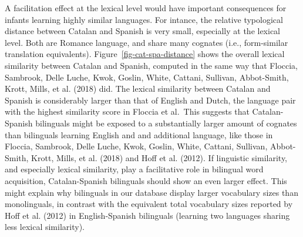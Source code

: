 \documentclass[
  12pt,
  b5paperpaper,
  twoside]{scrreprt}
\begin{document}
A facilitation effect at the lexical level would have important
consequences for infants learning highly similar languages. For intance,
the relative typological distance between Catalan and Spanish is very
small, especially at the lexical level. Both are Romance language, and
share many cognates (i.e., form-similar translation equivalents).
Figure~\ref{fig-cat-spa-distance} shows the overall lexical similarity
between Catalan and Spanish, computed in the same way that Floccia,
Sambrook, Delle Luche, Kwok, Goslin, White, Cattani, Sullivan,
Abbot-Smith, Krott, Mills, et al. (2018) did. The lexical similarity
between Catalan and Spanish is considerably larger than that of English
and Dutch, the language pair with the highest similarity score in
Floccia et al.~This suggests that Catalan-Spanish bilinguals might be
exposed to a substantially larger amount of cognates than bilinguals
learning English and and additional language, like those in Floccia,
Sambrook, Delle Luche, Kwok, Goslin, White, Cattani, Sullivan,
Abbot-Smith, Krott, Mills, et al. (2018) and Hoff et al. (2012). If
linguistic similarity, and especially lexical similarity, play a
facilitative role in bilingual word acquisition, Catalan-Spanish
bilinguals should show an even larger effect. This might explain why
bilinguals in our database display larger vocabulary sizes than
monolinguals, in contrast with the equivalent total vocabulary sizes
reported by Hoff et al. (2012) in English-Spanish bilinguals (learning
two languages sharing less lexical similarity).
\end{document}
